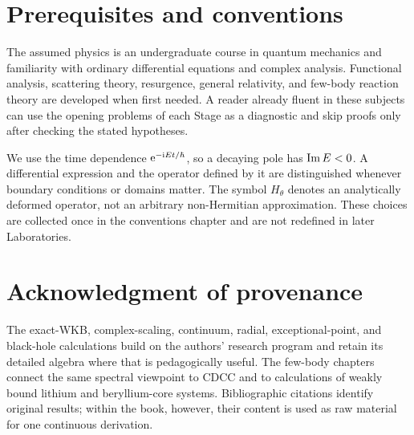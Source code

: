 \section*{Prerequisites and conventions}

The assumed physics is an undergraduate course in quantum mechanics and
familiarity with ordinary differential equations and complex analysis.
Functional analysis, scattering theory, resurgence, general relativity, and
few-body reaction theory are developed when first needed.  A reader already
fluent in these subjects can use the opening problems of each Stage as a
diagnostic and skip proofs only after checking the stated hypotheses.

We use the time dependence $\mathrm{e}^{-\mathrm{i} Et/\hbar}$, so a decaying pole has
$\operatorname{Im} E<0$.  A differential expression and the operator defined by it are
distinguished whenever boundary conditions or domains matter.  The symbol
$H_\theta$ denotes an analytically deformed operator, not an arbitrary
non-Hermitian approximation.  These choices are collected once in the
conventions chapter and are not redefined in later Laboratories.

\section*{Acknowledgment of provenance}

The exact-WKB, complex-scaling, continuum, radial, exceptional-point, and
black-hole calculations build on the authors' research program and retain
its detailed algebra where that is pedagogically useful.  The few-body
chapters connect the same spectral viewpoint to CDCC and to calculations of
weakly bound lithium and beryllium-core systems.  Bibliographic citations
identify original results; within the book, however, their content is used as
raw material for one continuous derivation.


